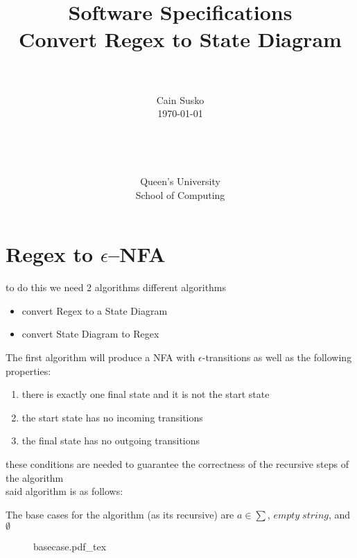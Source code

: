 \documentclass[12pt]{book}
\newcommand{\classID}{Convert Regex to State Diagram}
\newcommand{\coursename}{Software Specifications}
\newcommand{\incfig}[1]{%
    {#1.pdf_tex}
}
\begin{document}
\date{}
\setlength{\parindent}{0em}  %

\title{\coursename\\\classID}

\author{\\ \\ Cain Susko\\\today \\ \\ \\ \\ \\
        Queen's University \\School of Computing} 
 

\maketitle
\pagebreak

\section*{Regex to $\epsilon$--NFA}
to do this we need 2 algorithms different algorithms
\begin{itemize}
        \item convert Regex to a State Diagram 
        \item convert State Diagram to Regex
\end{itemize}

The first algorithm will produce a NFA with $\epsilon$-transitions as well as the following properties:\\

\begin{enumerate}
        \item there is exactly one final state and it is not the start state
        \item the start state has no incoming transitions
        \item the final state has no outgoing transitions
\end{enumerate}
these conditions are needed to guarantee the correctness of the recursive steps of the algorithm\\
said algorithm is as follows:

The base cases for the algorithm (as its recursive) are $a\in\sum$,  $empty\;string$, and $\emptyset$

\begin{figure}[h]
        \centering
        \incfig{basecase}
\end{figure}
\pagebreak
\end{document}
